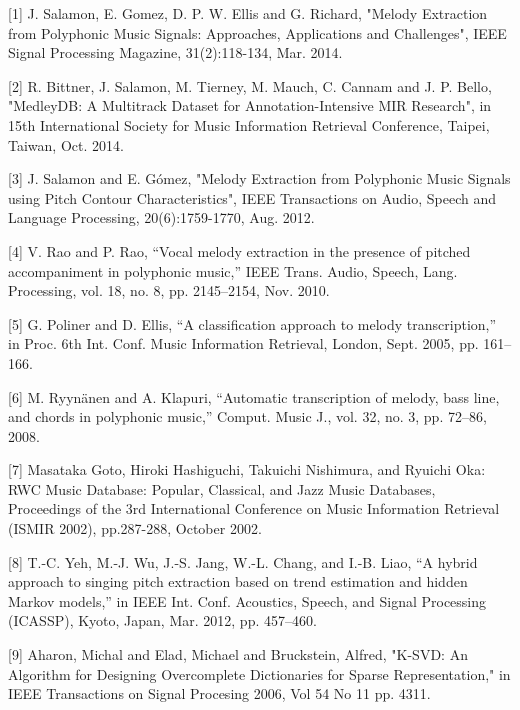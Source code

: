 \documentclass{article} %
\begin{document}
\small{
[1] J. Salamon, E. Gomez, D. P. W. Ellis and G. Richard, "Melody Extraction from Polyphonic Music Signals: Approaches, Applications and Challenges", IEEE Signal Processing Magazine, 31(2):118-134, Mar. 2014.

[2] R. Bittner, J. Salamon, M. Tierney, M. Mauch, C. Cannam and J. P. Bello, "MedleyDB: A Multitrack Dataset for Annotation-Intensive MIR Research", in 15th International Society for Music Information Retrieval Conference, Taipei, Taiwan, Oct. 2014.

[3] J. Salamon and E. Gómez, "Melody Extraction from Polyphonic Music Signals using Pitch Contour Characteristics", IEEE Transactions on Audio, Speech and Language Processing, 20(6):1759-1770, Aug. 2012.

[4] V. Rao and P. Rao, “Vocal melody extraction in the presence of pitched accompaniment
in polyphonic music,” IEEE Trans. Audio, Speech, Lang. Processing, vol. 18,
no. 8, pp. 2145–2154, Nov. 2010. 

[5] G. Poliner and D. Ellis, “A classification approach to melody transcription,” in Proc. 6th Int. Conf. Music Information Retrieval, London, Sept. 2005, pp. 161–166. 

[6] M. Ryynänen and A. Klapuri, “Automatic transcription of melody, bass line, and chords in polyphonic music,” Comput. Music J., vol. 32, no. 3, pp. 72–86, 2008. 

[7] Masataka Goto, Hiroki Hashiguchi, Takuichi Nishimura, and Ryuichi Oka: RWC Music Database: Popular, Classical, and Jazz Music Databases, Proceedings of the 3rd International Conference on Music Information Retrieval (ISMIR 2002), pp.287-288, October 2002. 

[8] T.-C. Yeh, M.-J. Wu, J.-S. Jang, W.-L. Chang, and I.-B. Liao, “A hybrid approach to singing pitch extraction based on trend estimation and hidden Markov models,” in IEEE Int. Conf. Acoustics, Speech, and Signal Processing (ICASSP), Kyoto, Japan, Mar. 2012, pp. 457–460.

[9] Aharon, Michal and Elad, Michael and Bruckstein, Alfred, "K-SVD: An Algorithm for Designing Overcomplete Dictionaries for Sparse Representation," in IEEE Transactions on Signal Procesing 2006, Vol 54 No 11 pp. 4311.
}
\end{document}

